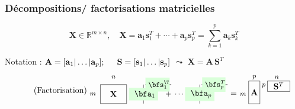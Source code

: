 \documentclass[9pt]{beamer}
\begin{document}
\begin{frame}
\frametitle{Décompositions/ factorisations  matricielles}

\begin{tcolorbox}[colback=blue!15,width=1.01\textwidth]
\[\tag{Décomposition}
\mathbf{X} \in \mathbb{R}^{m \times n}, \quad \mathbf{X} = \mathbf{a}_{1} \mathbf{s}_{1}^T + \cdots + \mathbf{a}_{p} \mathbf{s}_{p}^T = \sum_{k=1}^p  \mathbf{a}_{k} \mathbf{s}_{k}^T 
\]
\end{tcolorbox}

\begin{tcolorbox}[colback=green!15,width=1.01\textwidth]
Notation :
$\mathbf{A}=[\mathbf{a}_1 | \dots | \mathbf{a}_p ] ; \hspace{.5cm} \mathbf{S}=[\mathbf{s}_1 | \dots | \mathbf{s}_p ] $ \;  $\leadsto$ \; $\mathbf{X} = \mathbf{A} \,  \mathbf{S}^T $
\[\tag{Factorisation}
\raisebox{-0.35\height}{\begin{tikzpicture}[scale=0.8]
\draw(0,0.5) node (A) {$\mathbf{X}$};
\draw(-1.1,0.5) node (eq) {\footnotesize ${m}$};
\draw(0,1.4) node (eq) {\footnotesize ${n}$};
\draw(-0.7,0) rectangle (0.7,1);
\draw(1.1,0.5) node (eq) {${=}$};
\draw(1.6,0) -- (1.6,1);
\draw(1.6,0.5) node[fill=green!15] (a1) {{ $\bfa_1$}};
\draw(1.7,1) -- (3.08,1);
\draw(2.35,1) node[fill=green!15] (b1) {{\small $\bfs_1^{\T}\!\!$}};
\draw(3.5,0.5) node () {{\small $+\; \cdots\;+$}};
\draw(4.6,0) -- (4.6,1);
\draw(4.6,0.5) node[fill=green!15] (a1) {{ $\bfa_p$}};
\draw(4.7,1) -- (6.08,1);
\draw(5.35,1) node[fill=green!15] (b1) {{\small $\bfs_p^{T}\!\!$}};
\end{tikzpicture}}
\raisebox{-0.35\height}{\begin{tikzpicture}[scale=0.8]
\draw(1.2,0.5) node (eq) {$=$};

\draw(1.7,0.5) node (eq) {\footnotesize ${m}$};

\draw(2,0) rectangle (2.6,1.2); %
\draw(2.3,0.6) node (A) {$\mathbf{A}$};

\draw(2.3,1.4) node (eq) {\footnotesize ${p}$};
\draw(3.5,1.4) node (eq) {\footnotesize ${n}$};

\draw(3,0.65) rectangle (4.2,1.2); %
\draw(2.8,0.95) node (eq) {\footnotesize ${p}$};
\draw(3.6,0.95) node (A) {$\mathbf{S}^{T}$};
\end{tikzpicture}}
\]
\end{tcolorbox}


\end{frame}
\end{document}
